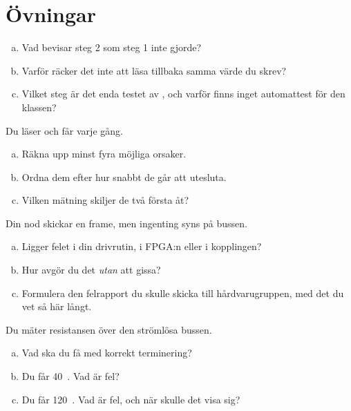 \section*{Övningar}

\label{ex:13:1}
\begin{enumerate}[a)]
  \item Vad bevisar steg 2 som steg 1 inte gjorde?
  \item Varför räcker det inte att läsa tillbaka samma värde du skrev?
  \item Vilket steg är det enda testet av , och varför finns inget
    automattest för den klassen?
\end{enumerate}

\label{ex:13:2}
Du läser  och får  varje gång.
\begin{enumerate}[a)]
  \item Räkna upp minst fyra möjliga orsaker.
  \item Ordna dem efter hur snabbt de går att utesluta.
  \item Vilken mätning skiljer de två första åt?
\end{enumerate}

\label{ex:13:3}
Din nod skickar en frame, men ingenting syns på bussen.
\begin{enumerate}[a)]
  \item Ligger felet i din drivrutin, i FPGA:n eller i kopplingen?
  \item Hur avgör du det \emph{utan} att gissa?
  \item Formulera den felrapport du skulle skicka till hårdvarugruppen, med det du vet så här
    långt.
\end{enumerate}

\label{ex:13:4}
Du mäter resistansen över den strömlösa bussen.
\begin{enumerate}[a)]
  \item Vad ska du få med korrekt terminering?
  \item Du får 40~\textohm. Vad är fel?
  \item Du får 120~\textohm. Vad är fel, och när skulle det visa sig?
\end{enumerate}
